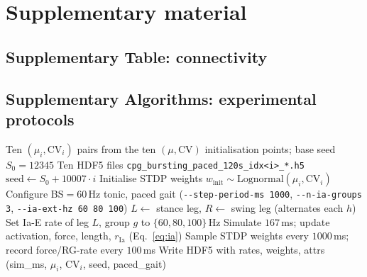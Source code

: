 \clearpage
\section*{Supplementary material}

\subsection*{Supplementary Table: connectivity}


\subsection*{Supplementary Algorithms: experimental protocols}

\begin{algorithm}[h]
\caption{Main experiment --- long-term self-organisation sweep over
$(\mu,\mathrm{CV})$.}\label{alg:main}
\begin{algorithmic}[1]
\Require Ten $(\mu_i,\mathrm{CV}_i)$ pairs from the ten $(\mu,\mathrm{CV})$ initialisation points; base seed $S_0=12345$
\Ensure Ten HDF5 files \texttt{cpg\_bursting\_paced\_120s\_idx<i>\_*.h5}
  \State $\text{seed} \gets S_0 + 10007 \cdot i$
  \State Initialise STDP weights $w_{\text{init}} \sim \mathrm{Lognormal}(\mu_i, \mathrm{CV}_i)$
  \State Configure BS$=60$\,Hz tonic, paced gait
         (\verb|--step-period-ms 1000|, \verb|--n-ia-groups 3|, \verb|--ia-ext-hz 60 80 100|)
    \State $L \gets$ stance leg, $R \gets$ swing leg (alternates each $h$)
     
      \State Set Ia-E rate of leg $L$, group $g$ to $\{60, 80, 100\}$\,Hz
      \State Simulate $167$\,ms; update activation, force, length, $r_{\text{Ia}}$ (Eq.~\ref{eq:ia})
      \State Sample STDP weights every $1000$\,ms; record force/RG-rate every $100$\,ms
    \EndFor
  \EndFor
  \State Write HDF5 with rates, weights, attrs (sim\_ms, $\mu_i$, $\mathrm{CV}_i$, seed, paced\_gait)
\EndFor
\end{algorithmic}
\end{algorithm}

